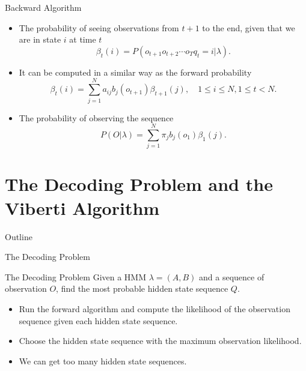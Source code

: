 \documentclass{beamer}
\begin{document}
\begin{frame}{Backward Algorithm}
	\begin{itemize}
		\item The probability of seeing observations from $t+1$ to the end, given that we are in state $i$ at time $t$
		\begin{equation}
			\beta_t(i) = P(o_{t+1}o_{t+2}\cdots o_T q_t = i \vert \lambda).
		\end{equation}
		\item It can be computed in a similar way as the forward probability
		\begin{equation}
			\beta_t(i) = \sum_{j=1}^N a_{ij}b_j(o_{t+1})\beta_{t+1}(j), \quad 1 \leq i \leq N, 1 \leq t < N.
		\end{equation}
		\item The probability of observing the sequence
		\begin{equation}
			P(O \vert \lambda) = \sum_{j=1}^N \pi_j b_j(o_1) \beta_1(j).
		\end{equation}
	\end{itemize}
\end{frame}


\section{The Decoding Problem and the Viberti Algorithm}
\begin{frame}{Outline}
	\tableofcontents[currentsection]
\end{frame}
\begin{frame}{The Decoding Problem }
	\begin{block}{The Decoding Problem}
		Given a HMM $\lambda = (A,B)$ and a sequence of observation $O$, find the most probable hidden state sequence $Q$.
	\end{block}
	\begin{itemize}
		\item Run the forward algorithm and compute the likelihood of the observation sequence given each hidden state sequence.
		\item Choose the hidden state sequence with the maximum observation likelihood.
		\item We can get too many hidden state sequences.
	\end{itemize}
\end{frame}
\end{document}
